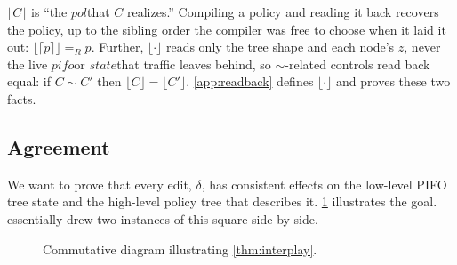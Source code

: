 \documentclass[sigplan,anonymous,review,nonacm]{acmart}
\newcommand{\csem}[1]{\mathcal{C}\llbracket #1 \rrbracket}
\newcommand{\psem}[1]{\mathcal{P}\llbracket #1 \rrbracket}
\newcommand{\eqR}{=_R}
\newcommand{\notation}[1]{\ensuremath{#1}\ifmmode\else\xspace\fi}
\newcommand{\pol}{\notation{\mathit{pol}}}
\newcommand{\pifo}{\notation{\mathit{pifo}}}
\newcommand{\zz}{\notation{\mathit{z}}}
\newcommand{\stt}{\notation{\mathit{state}}}
\begin{document}
\(\lfloor C \rfloor\) is ``the \pol that \(C\) realizes.''
Compiling a policy and reading it back recovers the policy, up to the sibling order the compiler was free to choose when it laid it out: \(\lfloor \lceil p \rceil \rfloor \eqR p\).
Further, \(\lfloor \cdot \rfloor\) reads only the tree shape and each node's \zz, never the live \pifo or \stt that traffic leaves behind, so \(\sim\)-related controls read back equal: if \(C \sim C'\) then \(\lfloor C \rfloor = \lfloor C' \rfloor\).
\cref{app:readback} defines \(\lfloor \cdot \rfloor\) and proves these two facts.

\subsection{Agreement}\label{sec:interplay}

We want to prove that every edit, $\delta$, has consistent effects on the low-level PIFO tree state and the high-level policy tree that describes it.
\cref{fig:interplay} illustrates the goal.
 essentially drew two instances of this square side by side.

\begin{figure}
\begin{center}
\end{center}
\caption{Commutative diagram illustrating \cref{thm:interplay}.}
\label{fig:interplay}
\end{figure}
\end{document}
